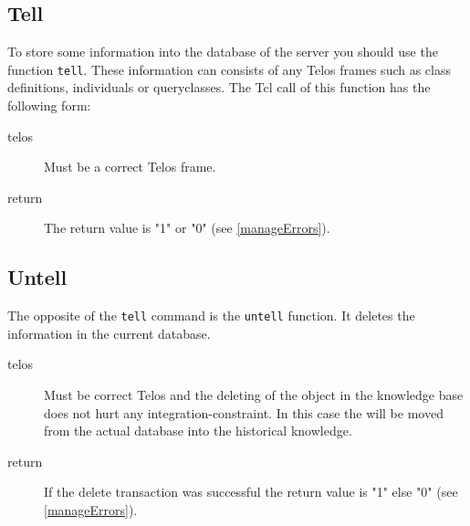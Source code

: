  \subsection{Tell}
	To store some information into the database of the server you
	 should use the function {\tt tell}. 
	These information can consists of any Telos frames such as
	 class definitions, individuals or queryclasses. 
	The Tcl call of this function has the following form: \\
	\begin{method}{  } 
	  \begin{description}
	    \item[ telos] Must be a correct Telos frame.
	    \item[ return] The return value 
		is "1" or "0" (see \ref{manageErrors}).
	  \end{description}
	\end{method}
 \subsection{Untell}
	The opposite of the {\tt tell} command is the {\tt untell} function.
	It deletes the information in the current database. \\
	\begin{method}{  } 
	  \begin{description}
	    \item[ telos] Must be
		correct Telos and the deleting of the object in 
		the knowledge base does not hurt any integration-constraint.
		In this case the will be moved from the actual database 
		into the historical knowledge. 
	    \item[ return] 
		If the delete transaction was successful 
		the return value is "1" else "0" (see \ref{manageErrors}).
	  \end{description}
	\end{method}
